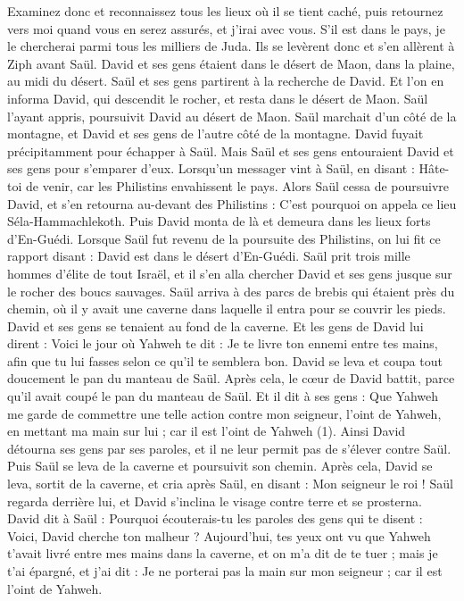 \begin{multicols}{2}
Examinez donc et reconnaissez tous les lieux où il se tient caché, puis retournez vers moi quand vous en serez assurés, et j'irai avec vous. S'il est dans le pays, je le chercherai parmi tous les milliers de Juda.
Ils se levèrent donc et s'en allèrent à Ziph avant Saül. David et ses gens étaient dans le désert de Maon, dans la plaine, au midi du désert.
Saül et ses gens partirent à la recherche de David. Et l’on en informa David, qui descendit le rocher, et resta dans le désert de Maon. Saül l’ayant appris, poursuivit David au désert de Maon.
Saül marchait d’un côté de la montagne, et David et ses gens de l'autre côté de la montagne. David fuyait précipitamment pour échapper à Saül. Mais Saül et ses gens entouraient David et ses gens pour s’emparer d’eux.
Lorsqu’un messager vint à Saül, en disant : Hâte-toi de venir, car les Philistins envahissent le pays.
Alors Saül cessa de poursuivre David, et s'en retourna au-devant des Philistins : C'est pourquoi on appela ce lieu Séla-Hammachlekoth.
\VerseOne{}Puis David monta de là et demeura dans les lieux forts d'En-Guédi.
Lorsque Saül fut revenu de la poursuite des Philistins, on lui fit ce rapport disant : David est dans le désert d’En-Guédi.
Saül prit trois mille hommes d'élite de tout Israël, et il s'en alla chercher David et ses gens jusque sur le rocher des boucs sauvages.
Saül arriva à des parcs de brebis qui étaient près du chemin, où il y avait une caverne dans laquelle il entra pour se couvrir les pieds. David et ses gens se tenaient au fond de la caverne.
Et les gens de David lui dirent : Voici le jour où Yahweh te dit : Je te livre ton ennemi entre tes mains, afin que tu lui fasses selon ce qu'il te semblera bon. David se leva et coupa tout doucement le pan du manteau de Saül.
Après cela, le cœur de David battit, parce qu'il avait coupé le pan du manteau de Saül.
Et il dit à ses gens : Que Yahweh me garde de commettre une telle action contre mon seigneur, l'oint de Yahweh, en mettant ma main sur lui ; car il est l'oint de Yahweh (1).
Ainsi David détourna ses gens par ses paroles, et il ne leur permit pas de s'élever contre Saül. Puis Saül se leva de la caverne et poursuivit son chemin.
Après cela, David se leva, sortit de la caverne, et cria après Saül, en disant : Mon seigneur le roi ! Saül regarda derrière lui, et David s'inclina le visage contre terre et se prosterna.
David dit à Saül : Pourquoi écouterais-tu les paroles des gens qui te disent : Voici, David cherche ton malheur ?
Aujourd'hui, tes yeux ont vu que Yahweh t'avait livré entre mes mains dans la caverne, et on m'a dit de te tuer ; mais je t'ai épargné, et j'ai dit : Je ne porterai pas la main sur mon seigneur ; car il est l'oint de Yahweh.

\end{multicols}
